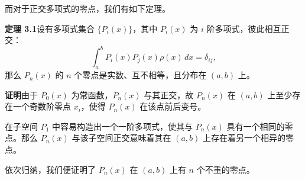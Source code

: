 而对于正交多项式的零点，我们有如下定理。

\textbf{定理 3.1}\quad 设有多项式集合 $\{P_i(x)\}$，其中 $P_i(x)$ 为 $i$ 阶多项式，彼此相互正交：
\begin{equation}
\int_a^b P_i(x)P_j(x)\rho(x)\,dx=\delta_{ij},
\tag{3.5.33}
\end{equation}
那么 $P_n(x)$ 的 $n$ 个零点是实数、互不相等，且分布在 $(a,b)$ 上。

\textbf{证明}\quad 由于 $P_0(x)$ 为常函数，$P_n(x)$ 与其正交，故 $P_n(x)$ 在 $(a,b)$ 上至少存在一个奇数阶零点 $x_i$，使得 $P_n(x)$ 在该点前后变号。

在子空间 $P_1$ 中容易构造出一个一阶多项式，使其与 $P_n(x)$ 具有一个相同的零点。那么 $P_n(x)$ 与该子空间正交意味着其在 $(a,b)$ 上存在着另一个相异的零点。

依次归纳，我们便证明了 $P_n(x)$ 在 $(a,b)$ 上有 $n$ 个不重的零点。


